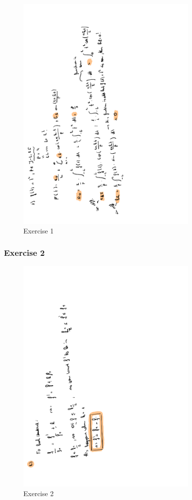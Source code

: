 \documentclass[a4paper]{report}
\begin{document}
\begin{figure}[H]
	\centering
	\includegraphics[angle=-90, width=0.8\textwidth]{assets/wc_9_ex_1.pdf}
	\caption{Exercise 1}
	\label{fig:wc_9_ex_1}
\end{figure}

\subsubsection{Exercise 2}

\begin{figure}[H]
	\centering
	\includegraphics[angle=-90, width=0.8\textwidth]{assets/wc_9_ex_2.pdf}
	\caption{Exercise 2}
\end{figure}
\end{document}
